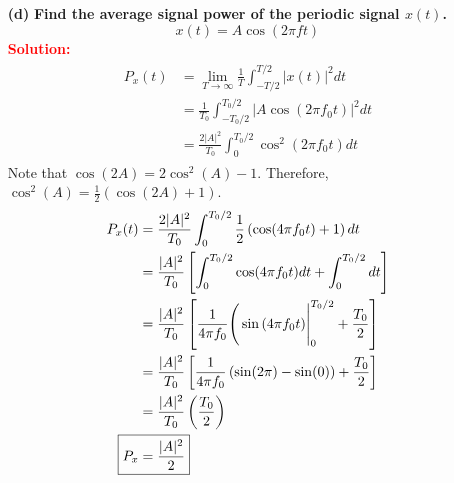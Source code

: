 \documentclass[a4paper, 12pt]{article}
\begin{document}
\begin{itemize}
\begin{itemize}
\pagebreak
\item[\textbf{(d)}]{\textbf{Find the average signal power of the periodic signal $x(t)$.}}
\begin{equation}
x(t) = A \cos \left(2 \pi f t \right)
\end{equation}
\textcolor{red}{\textbf{Solution:}}
\begin{equation}
\begin{gathered}
\begin{alignedat}{1}
P_{x}(t) & = \lim_{T \to \infty} \frac{1}{T} \int_{-T/2}^{T/2}{|x(t)|^{2}dt} \\
 & = \frac{1}{T_{0}} \int_{-T_{0}/2}^{T_{0}/2}{|A\cos \left(2 \pi f_{0} t \right)|^{2}dt} \\
 & = \frac{2|A|^{2}}{T_{0}} \int_{0}^{T_{0}/2}{\cos^{2} \left( 2 \pi f_{0} t\right) dt}
\end{alignedat}
\end{gathered}
\end{equation}
Note that $\cos (2A) = 2\cos^{2}(A) - 1$. Therefore, $\cos^{2}(A) = \frac{1}{2} \left(\cos(2A) + 1 \right)$.
\begin{equation}
\begin{gathered}
\begin{alignedat}{1}
P_{x}(t) &= \frac{2|A|^{2}}{T_{0}}\int_{0}^{T_{0}/2}{\frac{1}{2}\left(\cos(4\pi f_{0} t) + 1 \right) dt} \\
& = \frac{|A|^{2}}{T_{0}} \left[ \int_{0}^{T_{0}/2}{\cos(4\pi f_{0} t) dt } + \int_{0}^{T_{0}/2}{dt} \right] \\
&= \frac{|A|^{2}}{T_{0}} \left[ \frac{1}{4 \pi f_{0}}\Biggr( \sin\left(4 \pi f_{0} t \right) \Biggr\rvert_{0}^{T_{0}/2} + \frac{T_{0}}{2} \right] \\
& = \frac{|A|^{2}}{T_{0}} \left[ \frac{1}{4\pi f_{0}} \left( \sin(2\pi) - \sin(0)\right)  + \frac{T_{0}}{2}\right] \\
&= \frac{|A|^{2}}{T_{0}}\left( \frac{T_{0}}{2}\right) \\
\Aboxed{P_{x} &= \frac{|A|^{2}}{2}}
\end{alignedat}
\end{gathered}
\end{equation}


\end{itemize}
\end{itemize}
\end{document}
